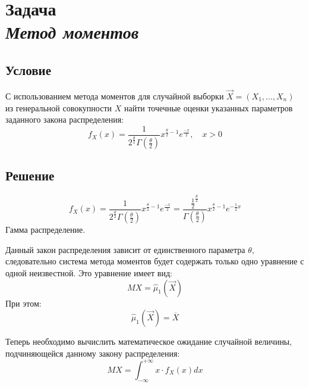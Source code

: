 \section*{Задача \\\textit{Метод моментов}}

\subsection*{Условие}
\sloppy С использованием метода моментов для случайной выборки $\vec{X} = (X_1,\dots,X_n)$ из генеральной совокупности $X$ найти точечные оценки указанных параметров заданного закона распределения:
\begin{equation*}
f_X(x) = \frac{1}{ 2^\frac{\theta{}}{2} \Gamma(\frac{\theta{}}{2}) }x^{\frac{\theta}{2}-1}e^\frac{-x}{2},\quad{}x > 0
\end{equation*}

\subsection*{Решение}

\begin{equation} \label{eq:equation}
    f_X(x) = \frac{1}{ 2^\frac{\theta{}}{2} \Gamma(\frac{\theta{}}{2}) }x^{\frac{\theta}{2}-1}e^\frac{-x}{2} = \frac{\frac{1}{2}^\frac{\theta}{2}}{\Gamma(\frac{\theta}{2})} x^{\frac{\theta}{2} - 1} e^{-\frac{1}{2}x}
\end{equation}
Гамма распределение.

Данный закон распределения зависит от единственного параметра $\theta$, следовательно система метода моментов будет содержать только одно уравнение с одной неизвестной. Это уравнение имеет вид:
\begin{equation} \label{eq:equation1}
    MX = \hat{\mu}_1(\overrightarrow{X})
\end{equation}
При этом:
\begin{equation} \label{eq:equation2}
    \hat{\mu}_1(\overrightarrow{X}) = \overline{X}
\end{equation}

Теперь необходимо вычислить математическое ожидание случайной величины, подчиняющейся данному закону распределения:
\begin{equation*}
    MX = \int^{+\infty}_{-\infty}x \cdot f_X(x)dx
\end{equation*}

